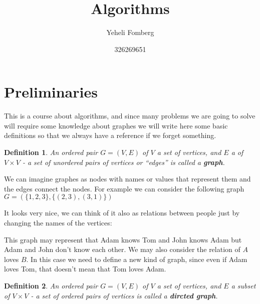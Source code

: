 \documentclass[11pt,a4paper]{article}
\title{\textbf{Algorithms}}
\author{Yeheli Fomberg}
\date{326269651}
\theoremstyle{plain}
\newtheorem{definition}{Definition}[section]
\begin{document}
	\maketitle
	\newpage
	\section{Preliminaries}
	This is a course about algorithms, and since many problems we are going to
	solve will require some knowledge about graphes we will write here
	some basic definitions so that we always have a reference if we forget
	something.
	\begin{definition}
	An ordered pair $G=(V,E)$ of $V$ a set of vertices, and $E$ a 
	of $V \times V$ - a set of unordered pairs of vertices or ``edges'' is 
	called a \textbf{graph}.
	\end{definition}
	We can imagine graphes as nodes with names or values that represent them
	and the edges connect the nodes. For example we can consider the following
	graph $G=(\{1,2,3\}, \{(2,3),(3,1)\})$
	\begin{center}\end{center}
	It looks very nice, we can think of it also as relations between people
	just by changing the names of the vertices:
	\begin{center}\end{center}
	This graph may represent that Adam knows Tom and John knows Adam but
	Adam and John don't know each other. We may also consider the relation
	of $A$ loves $B$. In this case we need to define a new kind of graph,
	since even if Adam loves Tom, that doesn't mean that Tom loves Adam.
	\begin{definition}
	An ordered pair $G=(V,E)$ of $V$ a set of vertices, and $E$ a subset
	of $V \times V$ - a set of ordered pairs of vertices is
	called a \textbf{dircted graph}.
	\end{definition}
\end{document}
